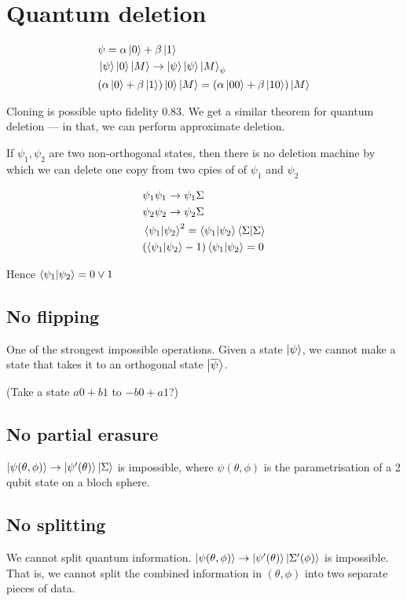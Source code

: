 \chapter{Quantum deletion}

\begin{align*}
    &\psi = \alpha \ket0 + \beta \ket 1 \\
    &\ket \psi \ket 0 \ket M \rightarrow \ket \psi \ket \psi \ket M_{\psi} \\
    &(\alpha \ket0 + \beta \ket 1) \ket 0 \ket M = (\alpha \ket{00} + \beta \ket{10}) \ket M \\
\end{align*}

Cloning is possible upto fidelity $0.83$. We get a similar theorem for
quantum deletion --- in that, we can perform approximate deletion.


If $\psi_1, \psi_2$ are two non-orthogonal states, then there is no deletion
machine by which we can delete one copy from two cpies of of $\psi_1$ and 
$\psi_2$

\begin{align*}
&\psi_1 \psi_1 \rightarrow \psi_1 \Sigma \\
&\psi_2 \psi_2 \rightarrow \psi_2 \Sigma \\
&\bra{\psi_1}\ket{\psi_2}^2 = \bra{\psi_1}\ket{\psi_2}\bra{\Sigma}\ket{\Sigma} \\
&(\bra{\psi_1}\ket{\psi_2} - 1) \bra{\psi_1}\ket{\psi_2} = 0
\end{align*}

Hence $\bra{\psi_1}\ket{\psi_2} = 0 \lor 1$


\section{No flipping}
One of the strongest impossible operations. Given a state $\ket{\psi}$, we cannot
make a state that takes it to an orthogonal state $\ket{\overline{\psi}}$.

(Take a state $a0 + b1$ to $-b0 + a1$?)


\section{No partial erasure}
$\ket{\psi(\theta, \phi)} \rightarrow \ket{\psi'(\theta)}\ket{\Sigma}$ is
impossible, where $\psi(\theta, \phi)$ is the parametrisation of a 2
qubit state on a bloch sphere.

\section{No splitting}
We cannot split quantum information.
$\ket{\psi(\theta, \phi)} \rightarrow \ket{\psi'(\theta)}\ket{\Sigma'(\phi)}$ is
impossible. That is, we cannot split the combined information in $(\theta, \phi)$
into two separate pieces of data.


